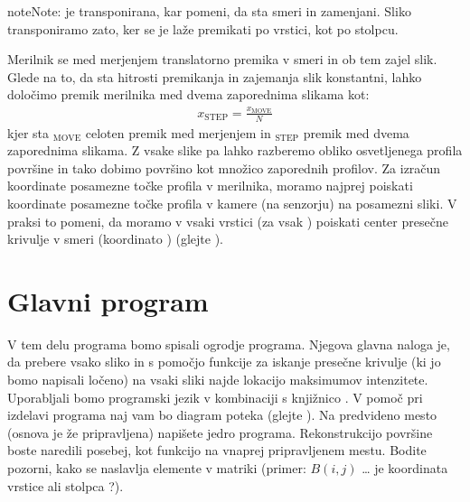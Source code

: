 \documentclass[letterpaper,10pt,english]{sphinxmanual}
\begin{document}
\begin{sphinxadmonition}{note}{Note:}
\sphinxAtStartPar
{} je transponirana, kar pomeni, da sta smeri  in  zamenjani. Sliko transponiramo zato, ker se je laže premikati po vrstici, kot po stolpcu.
\end{sphinxadmonition}

\sphinxAtStartPar
Merilnik se med merjenjem translatorno premika v  smeri in ob tem zajel  slik. Glede na to, da sta
hitrosti premikanja in zajemanja slik konstantni, lahko določimo premik merilnika med dvema
zaporednima slikama kot:
\begin{equation*}
\begin{split}x_{\text{STEP}} = \frac{ x_{\text{MOVE}}}{N}\end{split}
\end{equation*}
\sphinxAtStartPar
kjer sta $_{\text{MOVE}}$ celoten premik med merjenjem in $_{\text{STEP}}$ premik med dvema zaporednima slikama. Z vsake slike pa lahko razberemo obliko osvetljenega profila površine in tako dobimo površino kot množico zaporednih profilov.
Za izračun koordinate posamezne točke profila v  merilnika, moramo najprej poiskati koordinate
posamezne točke profila v  kamere (na senzorju) na posamezni sliki. V praksi to pomeni, da moramo
v vsaki vrstici (za vsak ) poiskati center presečne krivulje v smeri  (koordinato ) (glejte ).


\section{Glavni program}
\label{\detokenize{laserskiprofilomer:glavni-program}}
\sphinxAtStartPar
V tem delu programa bomo spisali ogrodje programa. Njegova glavna naloga je, da prebere vsako sliko
in s pomočjo funkcije za iskanje presečne krivulje (ki jo bomo napisali ločeno) na vsaki sliki najde
lokacijo maksimumov intenzitete.
Uporabljali bomo programski jezik  v kombinaciji s knjižnico . V pomoč pri izdelavi
programa naj vam bo diagram poteka (glejte ). Na predvideno mesto (osnova je že
pripravljena) napišete jedro programa. Rekonstrukcijo površine boste naredili posebej, kot funkcijo na
vnaprej pripravljenem mestu. Bodite pozorni, kako se naslavlja elemente v matriki (primer: \(B(i,j)\)  … je 
koordinata vrstice ali stolpca ?).
\end{document}
